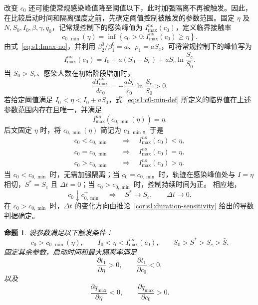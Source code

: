 \documentclass[UTF8,a4paper,10pt,fontset=fandol]{ctexart}
\theoremstyle{cnplain}
\newtheorem{proposition}[theorem]{命题}
\theoremstyle{remark}
\numberwithin{equation}{section}
\begin{document}
改变 $c_0$ 还可能使常规感染峰值降至阈值以下，此时加强隔离不再被触发。因此，在比较启动时间和隔离强度之前，先确定阈值控制被触发的参数范围。固定 $\eta$ 及 $N,S_0,I_0,\beta,\gamma,q_0$，记常规控制下的感染峰值为 $I_{\max}^{no}(c_0)$，定义临界接触率
\begin{equation}
c_{0,\min}(\eta)
=
\inf\left\{
c_0>0:
I_{\max}^{no}(c_0)\geq \eta
\right\}.
\label{eq:s1:c0-min-def}
\end{equation}
由式~\eqref{eq:s1:Imax-no}，并利用
$\beta_2^0/\beta_1^0=a$、$\rho_1=aS_c$，可将常规控制下的峰值写为
\begin{equation}
I_{\max}^{no}(c_0)
=
I_0+a(S_0-S_c)+aS_c\ln\frac{S_c}{S_0}.
\label{eq:s1:Imax-no-c0}
\end{equation}
当 $S_0>S_c$、感染人数在初始阶段增加时，
\begin{equation}
\frac{d I_{\max}^{no}}{dc_0}
=
-\frac{aS_c}{c_0}\ln\frac{S_c}{S_0}>0.
\label{eq:s1:Imax-no-c0-derivative}
\end{equation}
若给定阈值满足
$I_0<\eta<I_0+aS_0$，式~\eqref{eq:s1:c0-min-def} 所定义的临界值在上述参数范围内存在且唯一，并满足
\begin{equation}
I_{\max}^{no}\!\left(c_{0,\min}(\eta)\right)=\eta.
\label{eq:s1:c0-min-equality}
\end{equation}
后文固定 $\eta$ 时，将 $c_{0,\min}(\eta)$ 简记为 $c_{0,\min}$。于是
\begin{equation}
\begin{aligned}
c_0<c_{0,\min}
&\quad\Longrightarrow\quad I_{\max}^{no}(c_0)<\eta,\\
c_0=c_{0,\min}
&\quad\Longrightarrow\quad I_{\max}^{no}(c_0)=\eta,\\
c_0>c_{0,\min}
&\quad\Longrightarrow\quad I_{\max}^{no}(c_0)>\eta.
\end{aligned}
\label{eq:s1:c0-min-regimes}
\end{equation}
当 $c_0<c_{0,\min}$ 时，无需加强隔离；当 $c_0=c_{0,\min}$ 时，轨迹在感染峰值处与 $I=\eta$ 相切，$S^*=S_c$ 且 $\Delta t=0$；当 $c_0>c_{0,\min}$ 时，控制持续时间为正。
相应地，
\begin{equation}
c_0\downarrow c_{0,\min}^{+}
\quad\Longrightarrow\quad
S^*\to S_c,
\qquad
\Delta t\to0.
\label{eq:s1:c0-min-limit}
\end{equation}
在 $c_0>c_{0,\min}$ 时，$\Delta t$ 的变化方向由推论~\ref{cor:s1:duration-sensitivity} 给出的导数判据确定。

\begin{proposition}
\label{prop:s1:sensitivity}
设参数满足以下触发条件：
\[
c_0>c_{0,\min}(\eta),
\qquad
I_0<\eta<I_{\max}^{no}(c_0),
\qquad
S_0>S^*>S_c>\bar S.
\]
固定其余参数，启动时间和最大隔离率满足
\[
\frac{\partial t_1}{\partial \eta}>0,
\qquad
\frac{\partial t_1}{\partial c_0}<0,
\]
以及
\[
\frac{\partial q_{\max}}{\partial \eta}<0,
\qquad
\frac{\partial q_{\max}}{\partial c_0}>0.
\]
\end{proposition}
\end{document}
